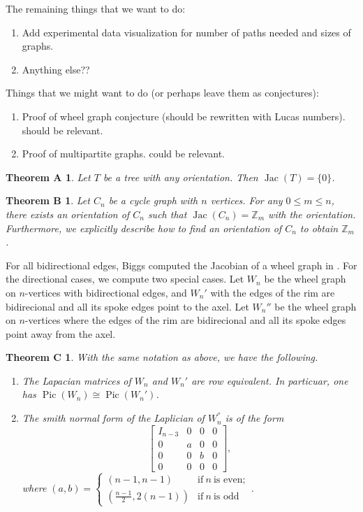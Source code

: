 \documentclass[11pt,reqno]{amsart}
\DeclareMathOperator{\Pic}{Pic}
\DeclareMathOperator{\Jac}{Jac}
\theoremstyle{definition}
\theoremstyle{plain}
\newtheorem*{nothma}{Theorem A}
\newtheorem*{nothmb}{Theorem B}
\newtheorem*{nothmc}{Theorem C}
\begin{document}
The remaining things that we want to do:
\begin{enumerate}
	\item 
Add experimental data visualization for number of paths needed and sizes of graphs. 
	\item 
Anything else??
\end{enumerate}

Things that we might want to do (or perhaps leave them as conjectures):
\begin{enumerate}
	\item 
Proof of wheel graph conjecture (should be rewritten with Lucas numbers). \cite{biggs1999chip} should be relevant. 
\item 
Proof of multipartite graphs. \cite{jacobson2003critical} could be relevant. 
\end{enumerate}

\begin{nothma}
Let $T$ be a tree with any orientation. Then $\Jac(T)=\{0\}$. 
\end{nothma}

\begin{nothmb}
Let $C_n$ be a cycle graph with $n$ vertices. For any $0 \leq m \leq n$, there exists an orientation of $C_n$ such that $\Jac(C_n)=\mathbb{Z}_m$ with the orientation. Furthermore, we explicitly describe how to find an orientation of $C_n$ to obtain $\mathbb{Z}_m$. 
\end{nothmb}

For all bidirectional edges, Biggs computed the Jacobian of a wheel graph in \cite{biggs1999chip}. For the directional cases, we compute two special cases. Let $W_n$ be the wheel graph on $n$-vertices with bidirectional edges, and $W_n'$ with the edges of the rim are bidirecional and all its spoke edges point to the axel. Let $W_n{''}$ be the wheel graph on $n$-vertices where the edges of the rim are bidirecional and all its spoke edges point away from the axel. 

\begin{nothmc}
With the same notation as above, we have the following. 
\begin{enumerate}
	\item 
The Lapacian matrices of $W_n$ and $W_n'$ are row equivalent. In particuar, one has $\Pic (W_n) \cong \Pic (W_n')$.	
	\item 
The smith normal form of the Laplician of $W_n^{''}$ is of the form 
\begin{equation*}
	\left[
	\begin{array}{c|ccc}	
		I_{n-3} & 0 & 0 & 0 \\
		\hline
		0 & a & 0 & 0 \\
		0 & 0 & b & 0 \\
		0 & 0 & 0 & 0 
	\end{array}
	\right],
\end{equation*}
where 
$(a,b) = \begin{cases}
	(n-1,n-1) & \text{if}~ n ~\text{is even}; \\
	(\frac{n-1}2, 2(n-1)) & \text{if}~ n ~\text{is odd}
\end{cases}$.	
\end{enumerate}
\end{nothmc}
\end{document}
